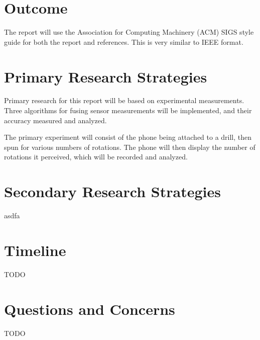 \documentclass[11pt]{article}
\begin{document}
\section{Outcome}
The report will use the Association for Computing Machinery (ACM) SIGS style guide for both the report and references.  This is very similar to IEEE format.

\section{Primary Research Strategies}
Primary research for this report will be based on experimental measurements.  Three algorithms for fusing sensor measurements will be implemented, and their accuracy measured and analyzed.

The primary experiment will consist of the phone being attached to a drill, then spun for various numbers of rotations.  The phone will then display the number of rotations it perceived, which will be recorded and analyzed. \cite{lu2009soundsense}


\section{Secondary Research Strategies}
asdfa

\section{Timeline}
TODO

\section{Questions and Concerns}
TODO




\end{document}
